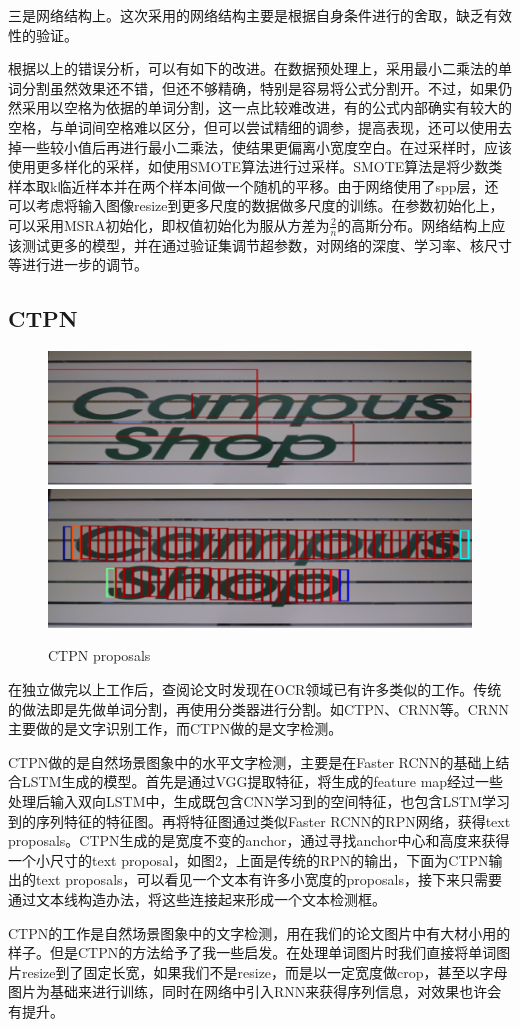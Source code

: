 三是网络结构上。这次采用的网络结构主要是根据自身条件进行的舍取，缺乏有效性的验证。

根据以上的错误分析，可以有如下的改进。在数据预处理上，采用最小二乘法的单词分割虽然效果还不错，但还不够精确，特别是容易将公式分割开。不过，如果仍然采用以空格为依据的单词分割，这一点比较难改进，有的公式内部确实有较大的空格，与单词间空格难以区分，但可以尝试精细的调参，提高表现，还可以使用去掉一些较小值后再进行最小二乘法，使结果更偏离小宽度空白。在过采样时，应该使用更多样化的采样，如使用SMOTE算法进行过采样。SMOTE算法是将少数类样本取k临近样本并在两个样本间做一个随机的平移。由于网络使用了spp层，还可以考虑将输入图像resize到更多尺度的数据做多尺度的训练。在参数初始化上，可以采用MSRA初始化，即权值初始化为服从方差为$\frac 2 n$的高斯分布。\cite{msra}网络结构上应该测试更多的模型，并在通过验证集调节超参数，对网络的深度、学习率、核尺寸等进行进一步的调节。

\subsection{CTPN}
\noindent

\begin{figure}[hp]
    \centering
    \includegraphics[scale=0.5]{rpn.eps}
    \includegraphics[scale=0.5]{ctpn.eps}
    \caption{CTPN proposals}
    \label{fig:label}
\end{figure}

在独立做完以上工作后，查阅论文时发现在OCR领域已有许多类似的工作。传统的做法即是先做单词分割，再使用分类器进行分割。如CTPN\cite{ctpn}、CRNN等。CRNN主要做的是文字识别工作，而CTPN做的是文字检测。

CTPN做的是自然场景图象中的水平文字检测，主要是在Faster RCNN的基础上结合LSTM生成的模型。首先是通过VGG提取特征，将生成的feature map经过一些处理后输入双向LSTM中，生成既包含CNN学习到的空间特征，也包含LSTM学习到的序列特征的特征图。再将特征图通过类似Faster RCNN的RPN网络，获得text proposals。CTPN生成的是宽度不变的anchor，通过寻找anchor中心和高度来获得一个小尺寸的text proposal，如图2，上面是传统的RPN的输出，下面为CTPN输出的text proposals，可以看见一个文本有许多小宽度的proposals，接下来只需要通过文本线构造办法，将这些连接起来形成一个文本检测框。

CTPN的工作是自然场景图象中的文字检测，用在我们的论文图片中有大材小用的样子。但是CTPN的方法给予了我一些启发。在处理单词图片时我们直接将单词图片resize到了固定长宽，如果我们不是resize，而是以一定宽度做crop，甚至以字母图片为基础来进行训练，同时在网络中引入RNN来获得序列信息，对效果也许会有提升。

